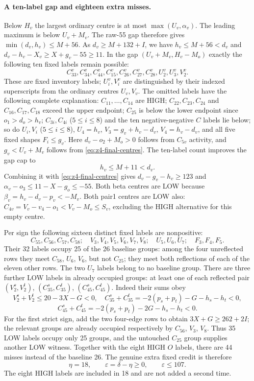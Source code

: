 \documentclass[11pt,letterpaper]{article}
\theoremstyle{definition}\newtheorem{definition}[theorem]{Definition}
\begin{document}
\paragraph{A ten-label gap and eighteen extra misses.}
Below $H_v$ the largest ordinary centre is at most $\max(U_v,\alpha_v)$.
The leading maximum is below $U_v+M_v$. The raw-55 gap therefore gives
$\min(d_v,h_v)\le M+56$. As $d_v\ge M+132+I$, we have
$h_v\le M+56<d_v$ and $d_v-h_v-X_v\ge X+g_v-55\ge11$.
In the gap $(U_v+M_v,H_v-M_o)$ exactly the following ten fixed labels remain possible:
\[
 C^v_{33},C^v_{34},C^v_{44},C^v_{15},C^v_{26},C^v_{27},C^v_{28},
 U^v_2,U^v_3,V^v_2.
\]
These are fixed inventory labels; $U^v_i,V^v_i$ are distinguished by their indexed superscripts from the ordinary centres $U_v,V_v$.
The omitted labels have the following complete explanation:
$C_{11},\ldots,C_{14}$ are HIGH;
$C_{22},C_{23},C_{24}$ and $C_{16},C_{17},C_{18}$ exceed the upper endpoint;
$C_{25}$ is below the lower endpoint since $o_1>d_o>h_v$;
$C_{3i},C_{4i}$ ($5\le i\le8$) and the ten negative-negative $C$ labels lie below;
so do $U_i,V_i$ ($5\le i\le8$), $U_4=h_v$, $V_3=g_v+h_v-d_v$, $V_4=h_v-d_v$, and all five fixed shapes $F_i\le g_v$.
Here $d_v-o_2+M_o>0$ follows from $C_{5v}$ activity, and $g_v<U_v+M_v$ follows from \eqref{eq:z4-final-centres}.
The ten-label count improves the gap cap to
\begin{equation}\label{eq:z4-h11}h_v\le M+11<d_v.\end{equation}
Combining it with \eqref{eq:z4-final-centres} gives
$d_v-g_v-h_v\ge123$ and $\alpha_v-o_3\le11-X-g_o\le-55$.
Both beta centres are LOW because $\beta_v=h_v-d_v-p_v<-M_v$.
Both pair1 centres are LOW also: $C_{4v}=V_v-v_4-o_1<V_v-M_o\le S_v$, excluding the HIGH alternative for this empty centre.

Per sign the following sixteen distinct fixed labels are nonpositive:
\[
 C_{55},C_{56},C_{57},C_{58};\quad
 V_3,V_4,V_5,V_6,V_7,V_8;\quad
 U_5,U_6,U_7;\quad F_3,F_4,F_5.
\]
Their 32 labels occupy 25 of the 26 baseline groups: among the four unreflected rows they meet $C_{58}$, $U_6$, $V_6$, but not $C_{25}$; they meet both reflections of each of the eleven other rows. The two $U_7$ labels belong to no baseline group.
There are three further LOW labels in already occupied groups: at least one of each reflected pair $(V^s_2,V^t_2)$, $(C^s_{35},C^t_{35})$, $(C^s_{45},C^t_{45})$. Indeed their sums obey
\[
 V^s_2+V^t_2\le20-3X-G<0,\quad
 C^s_{35}+C^t_{35}=-2(p_s+p_t)-G-h_s-h_t<0,
\]
\[
 C^s_{45}+C^t_{45}=-2(p_s+p_t)-2G-h_s-h_t<0.
\]
For the first strict sign, add the two four-edge rows to obtain $3X+G\ge262+2I$; the relevant groups are already occupied respectively by $C_{56}$, $V_3$, $V_8$.
Thus 35 LOW labels occupy only 25 groups, and the untouched $C_{25}$ group supplies another LOW witness. Together with the eight HIGH $O$ labels, there are 44 misses instead of the baseline 26. The genuine extra fixed credit is therefore
\begin{equation}\label{eq:z4eta18}\eta=18,\qquad\varepsilon=\delta-\eta\ge0,\qquad\varepsilon\le107.\end{equation}
The eight HIGH labels are included in 18 and are not added a second time.
\end{document}
